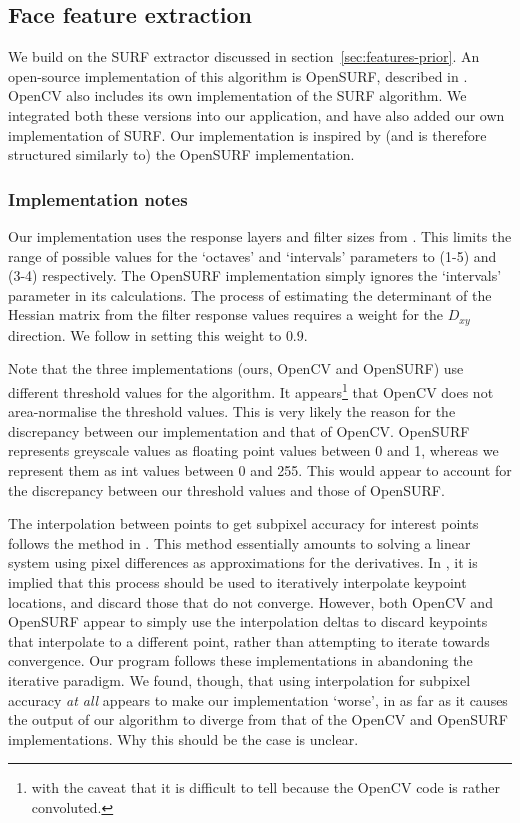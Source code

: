 
\subsection{Face feature extraction}
\label{sec:features}

We build on the SURF extractor discussed in section~\ref{sec:features-prior}. An open-source implementation of this algorithm is OpenSURF, described in \cite{OpenSURF}. OpenCV also includes its own implementation of the SURF algorithm. We integrated both these versions into our application, and have also added our own implementation of SURF. Our implementation is inspired by (and is therefore structured similarly to) the OpenSURF implementation.

\subsubsection{Implementation notes}
Our implementation uses the response layers and filter sizes from \cite{SURF}. This limits the range of possible values for the `octaves' and `intervals' parameters to (1-5) and (3-4) respectively. The OpenSURF implementation simply ignores the `intervals' parameter in its calculations. The process of estimating the determinant of the Hessian matrix from the filter response values requires a weight for the $D_{xy}$ direction. We follow \cite{SURF} in setting this weight to $0.9$.

Note that the three implementations (ours, OpenCV and OpenSURF) use different threshold values for the algorithm. It appears\footnote{ with the caveat that it is difficult to tell because the OpenCV code is rather convoluted.} that OpenCV does not area-normalise the threshold values. This is very likely the reason for the discrepancy between our implementation and that of OpenCV. OpenSURF represents greyscale values as floating point values between 0 and 1, whereas we represent them as int values between 0 and 255. This would appear to account for the discrepancy between our threshold values and those of OpenSURF.

The interpolation between points to get subpixel accuracy for interest points follows the method in \cite{inv-features}. This method essentially amounts to solving a linear system using pixel differences as approximations for the derivatives. In \cite{SURF}, it is implied that this process should be used to iteratively interpolate keypoint locations, and discard those that do not converge. However, both OpenCV and OpenSURF appear to simply use the interpolation deltas to discard keypoints that interpolate to a different point, rather than attempting to iterate towards convergence. Our program follows these implementations in abandoning the iterative paradigm. We found, though, that using interpolation for subpixel accuracy \emph{at all} appears to make our implementation `worse', in as far as it causes the output of our algorithm to diverge from that of the OpenCV and OpenSURF implementations. Why this should be the case is unclear.

